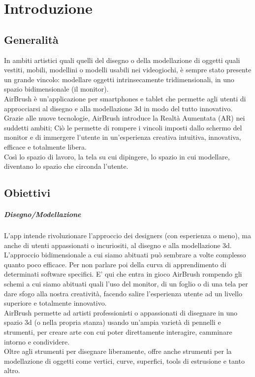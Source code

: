 \documentclass[11pt,fleqn]{book} %
\begin{document}
\pagestyle{fancy} %



\chapter{Introduzione}

\section{Generalità}
In ambiti artistici quali quelli del disegno o della modellazione di oggetti quali vestiti, mobili, modellini o modelli usabili nei videogiochi, è sempre stato presente un grande vincolo: modellare oggetti intrinsecamente tridimensionali, in uno spazio bidimensionale (il monitor).\\
AirBrush è un'applicazione per smartphones e tablet che permette agli utenti di approcciarsi al disegno e alla modellazione 3d in modo del tutto innovativo. \\
Grazie alle nuove tecnologie, AirBrush introduce la Realtà Aumentata (AR) nei suddetti ambiti; Ciò le permette di rompere i vincoli imposti dallo schermo del monitor e di immergere l'utente in un'esperienza creativa intuitiva, innovativa, efficace e totalmente libera.\\
Così lo spazio di lavoro, la tela su cui dipingere, lo spazio in cui modellare, diventano lo spazio che circonda l'utente.

\section{Obiettivi}
\paragraph{Disegno/Modellazione} L'app intende rivoluzionare l'approccio dei designers (con esperienza o meno), ma anche di utenti appassionati o incuriositi, al disegno e alla modellazione 3d. \\
L'approccio bidimensionale a cui siamo abituati può sembrare a volte complesso quanto poco efficace. Per non parlare poi della curva di apprendimento di determinati software specifici. E' qui che entra in gioco AirBrush rompendo gli schemi a cui siamo abituati quali l'uso del monitor, di un foglio o di una tela per dare sfogo alla nostra creatività, facendo salire l'esperienza utente ad un livello superiore e totalmente innovativo.\\
AirBrush permette ad artisti professionisti o appassionati di disegnare in uno spazio 3d (o nella propria stanza) usando un'ampia varietà di pennelli e strumenti, per creare arte con cui poter direttamente interagire, camminare intorno e condividere.\\
Oltre agli strumenti per disegnare liberamente, offre anche strumenti per la modellazione di oggetti come vertici, curve, superfici, tools di estrusione e tanto altro.
\end{document}
